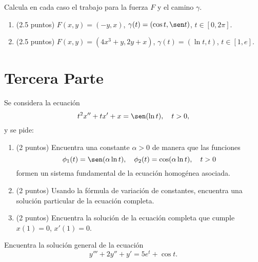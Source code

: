 \documentclass[12pt]{article}
\begin{document}
\begin{ejercicio}[5 puntos]
    Calcula en cada caso el trabajo para la fuerza $F$ y el camino $\gamma$.
    \begin{enumerate}
        \item (2.5 puntos) $F(x, y) = (-y, x)$, $\gamma(t) = (\cos t, \sen t)$, $t \in [0, 2\pi]$.
        \item (2.5 puntos) $F(x, y) = (4x^3 + y, 2y + x)$, $\gamma(t) = (\ln t, t)$, $t \in [1, e]$.
    \end{enumerate}
\end{ejercicio}

\section{Tercera Parte}
\begin{ejercicio}[6 puntos]
    Se considera la ecuación
    \begin{equation*}
        t^2x'' + tx' + x = \sen(\ln t), \quad t > 0,
    \end{equation*}
    y se pide:
    \begin{enumerate}
        \item (2 puntos) Encuentra una constante $\alpha > 0$ de manera que las funciones
        \[
            \phi_1(t) = \sen(\alpha \ln t), \quad \phi_2(t) = \cos(\alpha \ln t), \quad t > 0
        \]
        formen un sistema fundamental de la ecuación homogénea asociada.
        \item (2 puntos) Usando la fórmula de variación de constantes, encuentra una solución particular de la ecuación completa.
        \item (2 puntos) Encuentra la solución de la ecuación completa que cumple $x(1) = 0$, $x'(1) = 0$.
    \end{enumerate}
\end{ejercicio}

\begin{ejercicio}[4 puntos]
    Encuentra la solución general de la ecuación
    \begin{equation*}
        y''' + 2y'' + y' = 5e^t + \cos t.
    \end{equation*}
\end{ejercicio}
\end{document}

